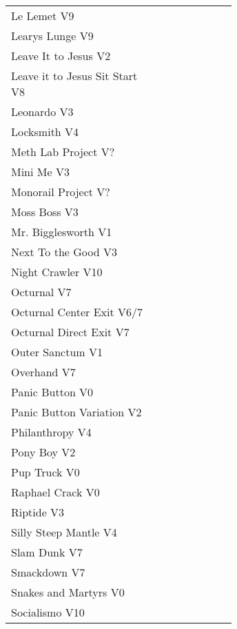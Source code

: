 \begin{flushleft}
\begin{center}
\begin{supertabular}{p{0.65\linewidth}r}
Le Lemet V9 & \pageref{rt:Le Lemet} \\
Learys Lunge V9 & \pageref{rt:Learys Lunge} \\
Leave It to Jesus V2 & \pageref{rt:Leave It to Jesus} \\
Leave it to Jesus Sit Start V8 & \pageref{vr:Leave it to Jesus Sit Start} \\
Leonardo V3 & \pageref{rt:Leonardo} \\
Locksmith V4 & \pageref{rt:Locksmith} \\
Meth Lab Project V? & \pageref{rt:Meth Lab Project} \\
Mini Me V3 & \pageref{rt:Mini Me} \\
Monorail Project V? & \pageref{rt:Monorail Project} \\
Moss Boss V3 & \pageref{rt:Moss Boss} \\
Mr. Bigglesworth V1 & \pageref{vr:Mr. Bigglesworth} \\
Next To the Good V3 & \pageref{rt:Next To the Good} \\
Night Crawler V10 & \pageref{rt:Night Crawler} \\
Octurnal V7 & \pageref{rt:Octurnal} \\
Octurnal Center Exit V6/7 & \pageref{vr:Octurnal Center Exit} \\
Octurnal Direct Exit V7 & \pageref{vr:Octurnal Direct Exit} \\
Outer Sanctum V1 & \pageref{rt:Outer Sanctum} \\
Overhand V7 & \pageref{rt:Overhand} \\
Panic Button V0 & \pageref{rt:Panic Button} \\
Panic Button Variation V2 & \pageref{vr:Panic Button Variation} \\
Philanthropy V4 & \pageref{rt:Philanthropy} \\
Pony Boy V2 & \pageref{rt:Pony Boy} \\
Pup Truck V0 & \pageref{rt:Pup Truck} \\
Raphael Crack V0 & \pageref{rt:Raphael Crack} \\
Riptide V3 & \pageref{rt:Riptide} \\
Silly Steep Mantle V4 & \pageref{rt:Silly Steep Mantle} \\
Slam Dunk V7 & \pageref{rt:Slam Dunk} \\
Smackdown V7 & \pageref{rt:Smackdown} \\
Snakes and Martyrs V0 & \pageref{rt:Snakes and Martyrs} \\
Socialismo V10 & \pageref{rt:Socialismo} \\

\end{supertabular}
\end{center}
\end{flushleft}
